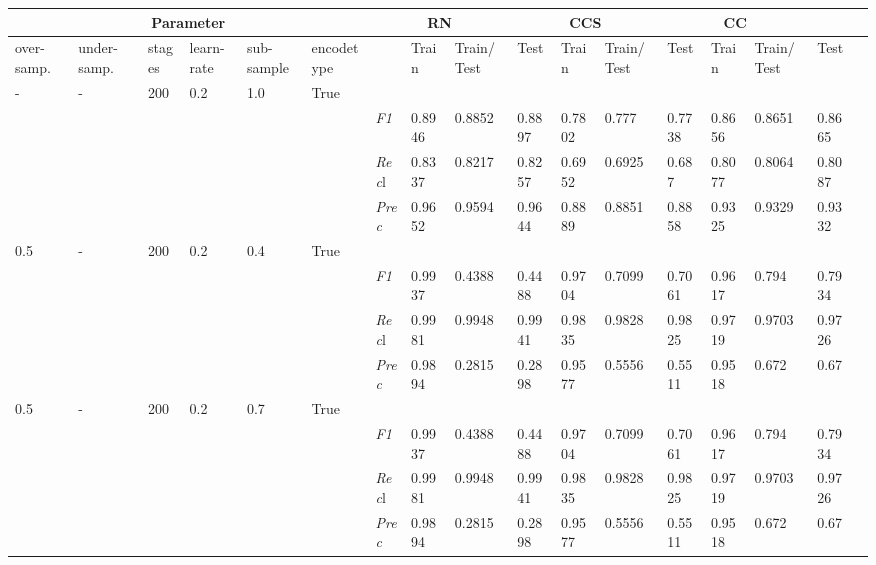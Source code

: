 \begin{table}[]
\tiny
\tabcolsep=0.11cm
\begin{tabularx}{\textwidth}{XXXXXX|X|XXX|XXX|XXXX}
\toprule
\multicolumn{6}{c}{Parameter} & \multicolumn{3}{c}{RN} & \multicolumn{3}{c}{CCS} & \multicolumn{3}{c}{CC} \\ \midrule
over-\newline samp. & under-\newline samp. & stages &learn-\newline rate & sub-\newline sample & encode\newline type & & Train & Train/\newline Test & Test & Train & Train/\newline Test & Test & Train & Train/\newline Test & Test \\ \midrule
- & - & 200 & 0.2 & 1.0 &True & & & & & & & & & \\
& & & & & & \textit{F1} & 0.8946 & 0.8852 & 0.8897 & 0.7802 & 0.777        & 0.7738        & 0.8656        & 0.8651        & 0.8665        \\
& & & & & & \textit{Rec}l & 0.8337 & 0.8217 & 0.8257    & 0.6952 & 0.6925    & 0.687    & 0.8077    & 0.8064    & 0.8087    \\
& & & & & & \textit{Prec} & 0.9652 & 0.9594 & 0.9644 & 0.8889 & 0.8851 & 0.8858 & 0.9325 & 0.9329 & 0.9332 \\ \midrule
0.5 & - & 200 & 0.2 & 0.4 &True & & & & & & & & & \\
& & & & & & \textit{F1} & 0.9937 & 0.4388 & 0.4488 & 0.9704 & 0.7099        & 0.7061        & 0.9617        & 0.794        & 0.7934        \\
& & & & & & \textit{Rec}l & 0.9981 & 0.9948 & 0.9941    & 0.9835 & 0.9828    & 0.9825    & 0.9719    & 0.9703    & 0.9726    \\
& & & & & & \textit{Prec} & 0.9894 & 0.2815 & 0.2898 & 0.9577 & 0.5556 & 0.5511 & 0.9518 & 0.672 & 0.67 \\ \midrule
0.5 & - & 200 & 0.2 & 0.7 &True & & & & & & & & & \\
& & & & & & \textit{F1} & 0.9937 & 0.4388 & 0.4488 & 0.9704 & 0.7099        & 0.7061        & 0.9617        & 0.794        & 0.7934        \\
& & & & & & \textit{Rec}l & 0.9981 & 0.9948 & 0.9941    & 0.9835 & 0.9828    & 0.9825    & 0.9719    & 0.9703    & 0.9726    \\
& & & & & & \textit{Prec} & 0.9894 & 0.2815 & 0.2898 & 0.9577 & 0.5556 & 0.5511 & 0.9518 & 0.672 & 0.67 \\ \midrule

\end{tabularx}
\end{table}
